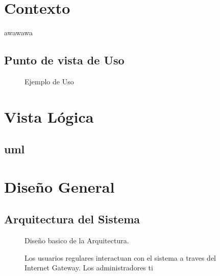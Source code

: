 \documentclass{article}
\begin{document}
\section{Contexto}
awawawa

\subsection{Punto de vista de Uso}

  \begin{figure}[!htb]
    \begin{center}
      
    \end{center}
    \caption{Ejemplo de Uso}\label{fig:}
  \end{figure}
  

\section{Vista L\'ogica}
\subsection{uml}

\begin{figure}[!htb]
  \begin{center}
    
  \end{center}
  \caption{}\label{fig:}
\end{figure}


\section{Dise\~no General}
  
  \subsection{Arquitectura del Sistema}
  \begin{figure}
    \begin{center}
      
    \end{center}
    \caption{}\label{fig: Arquitectura Basica}
  Dise\~no basico de la Arquitectura.
  \end{figure}

  \begin{figure}
    \begin{center}
      
    \end{center}
    \caption{}\label{fig: Implementacion en la Nube}
    Los usuarios regulares interactuan con el sistema a traves del Internet Gateway.
    Los administradores ti

  \end{figure}
\end{document}
